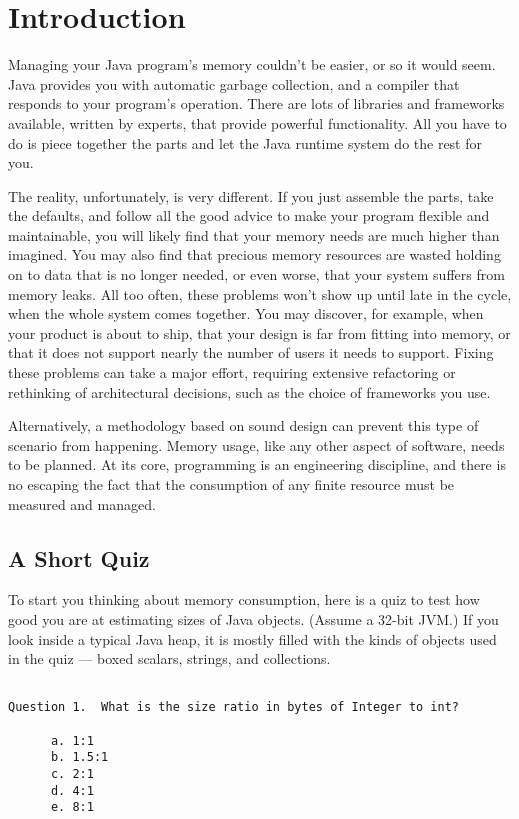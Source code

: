 
\chapter{Introduction}
\label{chapter:introduction}

Managing your Java program's memory couldn't be easier, or so it would seem.
Java provides you with automatic garbage collection, and a compiler that
responds to your program's operation. There are lots of libraries and frameworks
available, written by experts, that provide powerful functionality. All you have
to do is piece together the parts and let the Java runtime system do the rest
for you.

The reality, unfortunately, is very different.  If you just assemble the parts,
take the defaults, and follow all the good advice to make your program flexible
and maintainable, you will likely find that your memory needs are much higher
than imagined. You may also find that precious memory resources are wasted
holding on to data that is no longer needed, or even worse, that your system
suffers from memory leaks. All too often, these problems won't show up until
late in the cycle, when the whole system comes together. You may discover, 
for example, when your product is about to ship, that your design is far from fitting into memory, 
or that it does not support nearly the number of users it
needs to support.  Fixing these problems can take a major effort, requiring
extensive refactoring or rethinking of architectural decisions, such as the
choice of frameworks you use.  

Alternatively, a methodology based on sound design can
prevent this type of scenario from happening. Memory usage, like any other
aspect of software, needs to be planned. At its core, programming is an engineering
discipline, and there is no escaping the fact that the consumption of any finite
resource must be measured and managed.


\section{A Short Quiz}

 To start you thinking about memory
consumption, here is a quiz to test how good you are at estimating sizes of Java objects. 
(Assume a 32-bit JVM.) If you look inside a typical Java heap, it is mostly filled with the kinds of
objects used in the quiz --- boxed scalars, strings, and collections.
\begin{verbatim}

Question 1.  What is the size ratio in bytes of Integer to int?
   
      a. 1:1
      b. 1.5:1
      c. 2:1
      d. 4:1
      e. 8:1
      
\end{verbatim}

